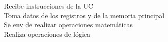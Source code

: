 \documentclass[preview]{standalone}
\begin{document}
Recibe instrucciones de la UC\\Toma datos de los registros y de la memoria principal\\Se env de realizar operaciones matemáticas\\Realiza operaciones de lógica\\
\end{document}
